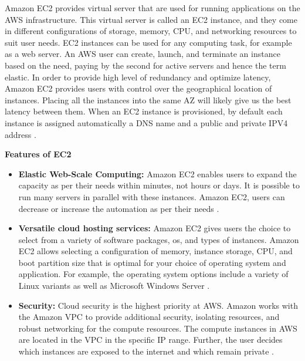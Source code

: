 \par Amazon EC2 provides virtual server that are used for
running applications on the AWS infrastructure.
This
virtual server is called an EC2 instance, and they come
in different configurations of storage, memory, CPU, and networking resources to suit user needs.
EC2 instances can be used for any computing task, for example as a web server.
An AWS user can create, launch, and terminate an instance based on the need, paying by the second for active servers and hence the term elastic.
In order to provide high level of redundancy and optimize latency, Amazon EC2 provides users with control over the geographical location of instances.
Placing all the instances into the same AZ will likely give us the best latency between them.
When an EC2 instance is provisioned, by default each instance is assigned automatically a DNS name and a public and private IPV4 address \cite{30}.

\textbf{Features of EC2}
\begin{itemize}
    \item \textbf{Elastic Web-Scale Computing:} Amazon EC2 enables users to expand the capacity as per their needs within minutes, not hours or days.
    It is possible to run many servers in
    parallel
    with these instances.
    Amazon EC2, users can decrease or increase the
    automation as per their needs \cite{31}.
\end{itemize}

\begin{itemize}
    \item \textbf{Versatile cloud hosting services:} Amazon EC2 gives users the choice to select from a variety of software packages, os, and types of instances.
    Amazon EC2 allows selecting a configuration of memory, instance storage, CPU, and boot partition size that is optimal for your choice of operating system and application. For example, the operating system options include a variety of Linux variants as well as Microsoft Windows Server \cite{29}.
\end{itemize}

\begin{itemize}
    \item \textbf{Security:} Cloud security is the highest priority at AWS. Amazon works with the Amazon VPC to provide additional security, isolating resources, and robust networking for the compute resources.
    The compute instances in AWS are located in the VPC in the specific IP range.
    Further, the user decides which instances are exposed
    to the internet and which remain private \cite{31}.
\end{itemize}

